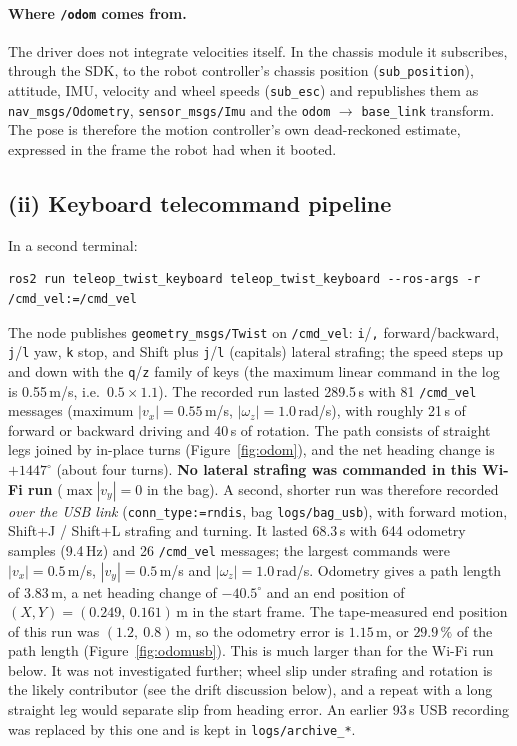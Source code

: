 \documentclass[11pt,a4paper]{article}
\begin{document}
\paragraph{Where \texttt{/odom} comes from.} The driver does not integrate velocities itself. In the chassis module it subscribes, through the SDK, to the robot controller's chassis position (\texttt{sub\_position}), attitude, IMU, velocity and wheel speeds (\texttt{sub\_esc}) and republishes them as \texttt{nav\_msgs/Odometry}, \texttt{sensor\_msgs/Imu} and the \texttt{odom} $\to$ \texttt{base\_link} transform. The pose is therefore the motion controller's own dead-reckoned estimate, expressed in the frame the robot had when it booted.

\subsection{(ii) Keyboard telecommand pipeline}
In a second terminal:
\begin{Verbatim}[fontsize=\small]
ros2 run teleop_twist_keyboard teleop_twist_keyboard --ros-args -r /cmd_vel:=/cmd_vel
\end{Verbatim}
The node publishes \texttt{geometry\_msgs/Twist} on \texttt{/cmd\_vel}: \texttt{i}/\texttt{,} forward/backward, \texttt{j}/\texttt{l} yaw, \texttt{k} stop, and Shift plus \texttt{j}/\texttt{l} (capitals) lateral strafing; the speed steps up and down with the \texttt{q}/\texttt{z} family of keys (the maximum linear command in the log is 0.55\,m/s, i.e.\ $0.5\times1.1$). The recorded run lasted 289.5\,s with 81 \texttt{/cmd\_vel} messages (maximum $|v_x|=0.55$\,m/s, $|\omega_z|=1.0$\,rad/s), with roughly 21\,s of forward or backward driving and 40\,s of rotation. The path consists of straight legs joined by in-place turns (Figure~\ref{fig:odom}), and the net heading change is $+1447^\circ$ (about four turns).
\textbf{No lateral strafing was commanded in this Wi-Fi run} ($\max|v_y|=0$ in the bag). A second, shorter run was therefore recorded \emph{over the USB link} (\texttt{conn\_type:=rndis}, bag \texttt{logs/bag\_usb}), with forward motion, Shift+J / Shift+L strafing and turning. It lasted 68.3\,s with 644 odometry samples (9.4\,Hz) and 26 \texttt{/cmd\_vel} messages; the largest commands were $|v_x|=0.5$\,m/s, $|v_y|=0.5$\,m/s and $|\omega_z|=1.0$\,rad/s. Odometry gives a path length of 3.83\,m, a net heading change of $-40.5^\circ$ and an end position of $(X,Y)=(0.249,\,0.161)$\,m in the start frame. The tape-measured end position of this run was $(1.2,\ 0.8)$\,m, so the odometry error is $1.15$\,m, or $29.9\,\%$ of the path length (Figure~\ref{fig:odomusb}). This is much larger than for the Wi-Fi run below. It was not investigated further; wheel slip under strafing and rotation is the likely contributor (see the drift discussion below), and a repeat with a long straight leg would separate slip from heading error. An earlier 93\,s USB recording was replaced by this one and is kept in \texttt{logs/archive\_*}.
\end{document}

